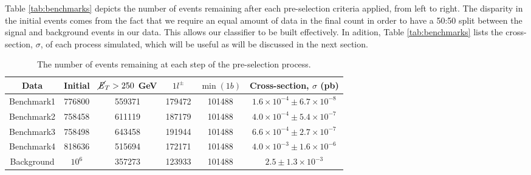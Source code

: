 Table \ref{tab:benchmarks} depicts the number of events remaining after each pre-selection criteria applied, from left to right. The disparity in the initial events comes from the fact that we require an equal amount of data in the final count in order to have a 50:50 split between the signal and background events in our data. This allows our classifier to be built effectively. In adition, Table \ref{tab:benchmarks} lists the cross-section, $\sigma$, of each process simulated, which will be useful as will be discussed in the next section. \\

\begin{table}[htbp]
    \centering
    \begin{tabular}{c|c|c|c|c||c} 
    \toprule
    Data & Initial & $\cancel{\it{E}}_{T}>250$ GeV & $1l^\pm$ & $\min(1b)$ & Cross-section, $\sigma$ (pb) \\
    \midrule
    \rowcolor{gray!6} Benchmark1 & 776800 & 559371 & 179472 & 101488 & $1.6\times10^{-4} \pm 6.7\times10^{-8}$ \\
    Benchmark2 & 758458 & 611119 & 187179 & 101488 & $4.0\times10^{-4} \pm  5.4\times10^{-7}$ \\
    \rowcolor{gray!6} Benchmark3 & 758498 & 643458 & 191944 & 101488 & $6.6\times10^{-4} \pm 2.7\times10^{-7}$ \\
    Benchmark4 & 818636 & 515694 & 172171 &101488  & $4.0\times10^{-3} \pm 1.6\times10^{-6}$ \\
    \rowcolor{gray!6} Background & $10^6$ & 357273 & 123933 & 101488 & $2.5 \pm 1.3\times10^{-3}$ \\
    \bottomrule
    \end{tabular}
    \caption{The number of events remaining at each step of the pre-selection process.} 
    \label{tab:preselection}
\end{table}